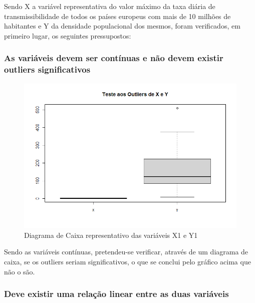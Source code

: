 \documentclass[conference]{IEEEtran}
\begin{document}
Sendo X a variável representativa do valor máximo da taxa diária de transmissibilidade de todos os países europeus com mais de 10 milhões de habitantes e Y da densidade populacional dos mesmos, foram verificados, em primeiro lugar, os seguintes pressupostos:

\subsubsection{As variáveis devem ser contínuas e não devem existir outliers significativos}

\begin{figure}[htbp]
\centerline{\includegraphics[width=0.95\columnwidth]{images/03.a.1.png}}
\caption{Diagrama de Caixa representativo das variáveis X1 e Y1}
\label{fig}
\end{figure}

Sendo as variáveis contínuas, pretendeu-se verificar, através de um diagrama de caixa, se os outliers seriam significativos, o que se conclui pelo gráfico acima que não o são.

\subsubsection{Deve existir uma relação linear entre as duas variáveis}
\end{document}
